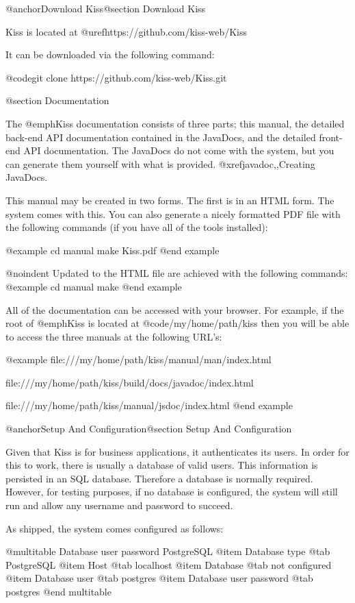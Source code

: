 @anchor{Download Kiss}@section Download Kiss


Kiss is located at @uref{https://github.com/kiss-web/Kiss}

It can be downloaded via the following command:

@code{git clone https://github.com/kiss-web/Kiss.git}

@section Documentation

The @emph{Kiss} documentation consists of three parts; this manual, the detailed back-end API documentation contained in the JavaDocs,
and the detailed front-end API documentation.
The JavaDocs do not come with the system, but you can generate them yourself with what is provided.  @xref{javadoc,,Creating JavaDocs}.

This manual may be created in two forms.  The first is in an HTML
form.  The system comes with this.  You can also generate a nicely
formatted PDF file with the following commands (if you have all of the tools installed):

@example
cd manual
make Kiss.pdf
@end example

@noindent
Updated to the HTML file are achieved with the following commands:
@example
cd manual
make
@end example

All of the documentation can be accessed with your browser.  For example,
if the root of @emph{Kiss} is located at @code{/my/home/path/kiss} then you will be able to access the three
manuals at the following URL's:

@example
file:///my/home/path/kiss/manual/man/index.html

file:///my/home/path/kiss/build/docs/javadoc/index.html

file:///my/home/path/kiss/manual/jsdoc/index.html
@end example

@anchor{Setup And Configuration}@section Setup And Configuration

Given that Kiss is for business applications, it authenticates its
users.  In order for this to work, there is usually a database of valid
users.  This information is persisted in an SQL database.  Therefore a
database is normally required.  However, for testing purposes, if no
database is configured, the system will still run and allow any
username and password to succeed.

As shipped, the system comes configured as follows:

@multitable {Database user password} {PostgreSQL} 
@item Database type
@tab PostgreSQL
@item Host
@tab localhost
@item Database
@tab not configured
@item Database user
@tab postgres
@item Database user password
@tab postgres
@end multitable

